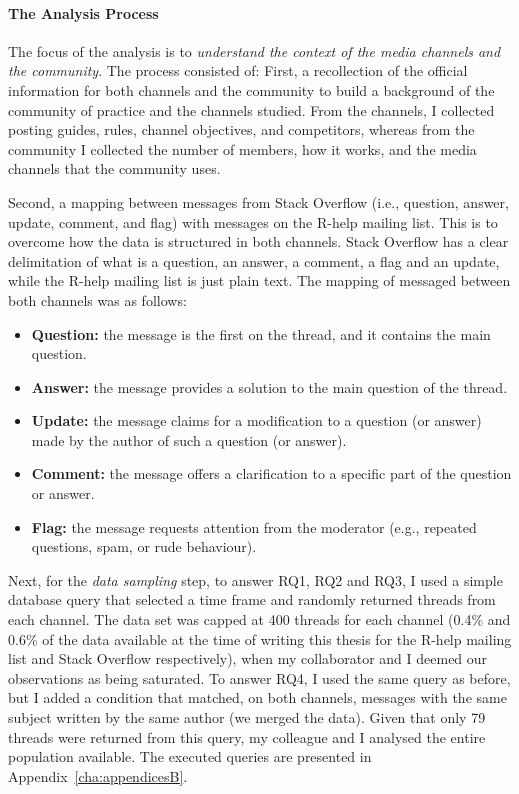 \documentclass{sig-alternate-05-2015}
\begin{document}
\paragraph{The Analysis Process}

	The focus of the analysis is to \textit{understand the context of the media channels and the community}.
	The process consisted of:
	First, a recollection of the official information for both channels and the community to build a background of the community of practice and the channels studied.
    From the channels, I collected posting guides, rules, channel objectives, and competitors, whereas from the community I collected the number of members, how it works, and the media channels that the community uses.

	Second, a mapping between messages from Stack Overflow (i.e., question, answer, update, comment, and flag) with messages on the R-help mailing list.
    This is to overcome how the data is structured in both channels.
    Stack Overflow has a clear delimitation of what is a question, an answer, a comment, a flag and an update, while the R-help mailing list is just plain text.
    The mapping of messaged between both channels was as follows:

	\begin{itemize}
		\item \textbf{Question:} the message is the first on the thread, and it contains the main question.
		\item \textbf{Answer:} the message provides a solution to the main question of the thread.
	 	\item \textbf{Update:} the message claims for a modification to a question (or answer) made by the author of such a question (or answer).
		\item \textbf{Comment:} the message offers a clarification to a specific part of the question or answer.
		\item \textbf{Flag:} the message requests attention from the moderator (e.g., repeated questions, spam, or rude behaviour).
	\end{itemize}

	Next, for the \textit{data sampling} step, to answer RQ1, RQ2 and RQ3, I used a simple database query that selected a time frame and randomly returned threads from each channel.
	The data set was capped at 400 threads for each channel (0.4\% and 0.6\% of the data available at the time of writing this thesis for the R-help mailing list and Stack Overflow respectively), when my collaborator and I deemed our observations as being saturated.
	To answer RQ4, I used the same query as before, but I added a condition that matched, on both channels, messages with the same subject written by the same author (we merged the data).
	Given that only 79 threads were returned from this query, my colleague and I analysed the entire population available. 
	The executed queries are presented in Appendix~\ref{cha:appendicesB}.
\end{document}
